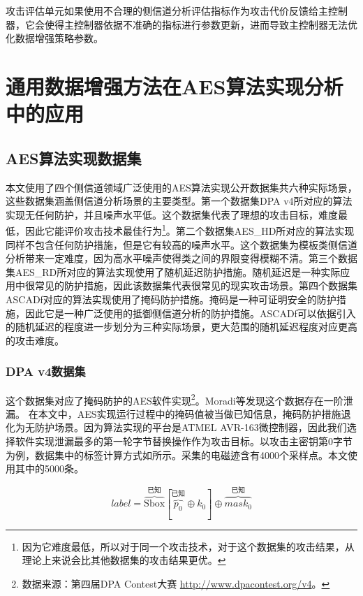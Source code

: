 {	攻击评估单元如果使用不合理的侧信道分析评估指标作为攻击代价反馈给主控制器，它会使得主控制器依据不准确的指标进行参数更新，进而导致主控制器无法优化数据增强策略参数。
	\section{通用数据增强方法在AES算法实现分析中的应用}\label{sec:intoreal}
	\subsection{AES算法实现数据集}
	
	本文使用了四个侧信道领域广泛使用的AES算法实现公开数据集共六种实际场景，这些数据集涵盖侧信道分析场景的主要类型。第一个数据集DPA v4所对应的算法实现无任何防护，并且噪声水平低。这个数据集代表了理想的攻击目标，难度最低，因此它能评价攻击技术最佳行为\footnote{因为它难度最低，所以对于同一个攻击技术，对于这个数据集的攻击结果，从理论上来说会比其他数据集的攻击结果更优。}。第二个数据集AES\_HD所对应的算法实现同样不包含任何防护措施，但是它有较高的噪声水平。这个数据集为模板类侧信道分析带来一定难度，因为高水平噪声使得类之间的界限变得模糊不清。第三个数据集AES\_RD所对应的算法实现使用了随机延迟防护措施。随机延迟是一种实际应用中很常见的防护措施，因此该数据集代表很常见的现实攻击场景。第四个数据集ASCADf对应的算法实现使用了掩码防护措施。掩码是一种可证明安全的防护措施，因此它是一种广泛使用的抵御侧信道分析的防护措施。ASCADf可以依据引入的随机延迟的程度进一步划分为三种实际场景，更大范围的随机延迟程度对应更高的攻击难度。
	
	\subsubsection{DPA v4数据集}
	
	这个数据集对应了掩码防护的AES软件实现\footnote{数据来源：第四届DPA Contest大赛 \href{http://www.dpacontest.org/v4}{http://www.dpacontest.org/v4}。}。Moradi等\citep{Moradi14}发现这个数据存在一阶泄漏。%
	在本文中，AES实现运行过程中的掩码值被当做已知信息，掩码防护措施退化为无防护场景。因为算法实现的平台是ATMEL AVR-163微控制器，因此我们选择软件实现泄漏最多的第一轮字节替换操作作为攻击目标。以攻击主密钥第0字节为例，数据集中的标签计算方式如所示。采集的电磁迹含有4000个采样点。本文使用其中的5000条。
	
	\begin{equation}\label{eq:dpav4model}
		label=\overbrace{\mathrm{Sbox}}^{\mbox{已知}}[\overbrace{p_0}^{\mbox{已知}}\oplus k_0]\oplus \overbrace{mask_0}^{\mbox{已知}}
	\end{equation}
	
}
